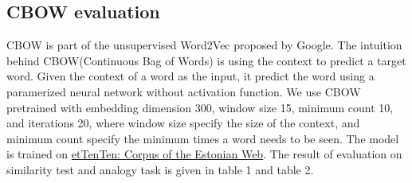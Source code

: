 \documentclass[a4paper, 11pt]{article}
\begin{document}
    \subsection{CBOW evaluation}
 CBOW is part of the unsupervised Word2Vec proposed by Google. The intuition behind CBOW(Continuous Bag of Words) is using the context to predict a target word. Given the context of a word as the input, it predict the word using a paramerized neural network without activation function. We use CBOW pretrained with embedding dimension 300, window size 15, minimum count 10, and iterations 20, where window size specify the size of the context, and minimum count specify the minimum times a word needs to be seen. The model is trained on \href{https://doi.org/10.15155/1-00-0000-0000-0000-0012el}{etTenTen: Corpus of the Estonian Web}. The result of evaluation on similarity test and analogy task is given in table 1 and table 2.
\begin{table*}[ht!]
\centering
{}
\caption{Similarity result of CBOW}
\label{tab:my-table}
\end{table*} 
\begin{table}[ht!]
\centering
{}
\caption{Analogy tasks on CBOW }
\label{tab:my-table}
\end{table}
 
\end{document}
